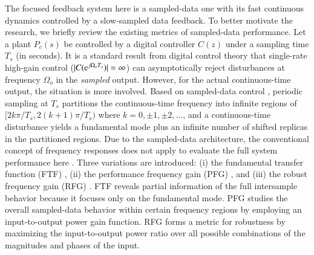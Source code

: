 \documentclass [11pt, proquest] {uwthesis}[2020/02/24]
\begin{document}
The focused feedback system here is a sampled-data one with its fast
continuous dynamics controlled by a slow-sampled data feedback. To
better motivate the research, we briefly review the existing metrics
of sampled-data performance. Let a plant $P_{c}(s)$ be controlled
by a digital controller $C(z)$ under a sampling time $T_{s}$ (in
seconds). It is a standard result from digital control theory that
single-rate high-gain control (\emph{$|C(\mathrm{e}^{j\Omega_{o}T_{s}})|=\infty$})
can asymptotically reject disturbances at frequency $\Omega_{o}$
in the \emph{sampled} output. However, for the actual continuous-time
output, the situation is more involved. Based on sampled-data control
\cite{Yamamoto1996,Araki1996483,Hagiwara20011363,Yamamoto19941319,Goodwin19941263},
periodic sampling at $T_{s}$ partitions the continuous-time frequency
into infinite regions of $[2k\pi/T_{s},2(k+1)\pi/T_{s})$ where $k=0,\pm1,\pm2,\dots$,
and a continuous-time disturbance yields a fundamental mode plus an
infinite number of shifted replicas in the partitioned regions. Due
to the sampled-data architecture, the conventional concept of frequency
responses does not apply to evaluate the full system performance here
\cite{Yamamoto1996,Araki1996483,Hagiwara20011363,Yamamoto19941319,doi:10.1080/00207179508921961,Goodwin19941263}.
Three variations are introduced: (i) the fundamental transfer function
(FTF) \cite{Goodwin19941263}, (ii) the performance frequency gain
(PFG) \cite{lindgarde1997performance,Cantoni:ki}, and (iii) the robust
frequency gain (RFG) \cite{Yamamoto1996}. FTF reveals partial information
of the full intersample behavior because it focuses only on the fundamental
mode. PFG studies the overall sampled-data behavior within certain
frequency regions by employing an input-to-output power gain function\cite{oomen2007design}.
RFG forms a metric for robustness by maximizing the input-to-output
power ratio over all possible combinations of the magnitudes and phases
of the input\cite{lindgarde1999frequency}.
\end{document}
